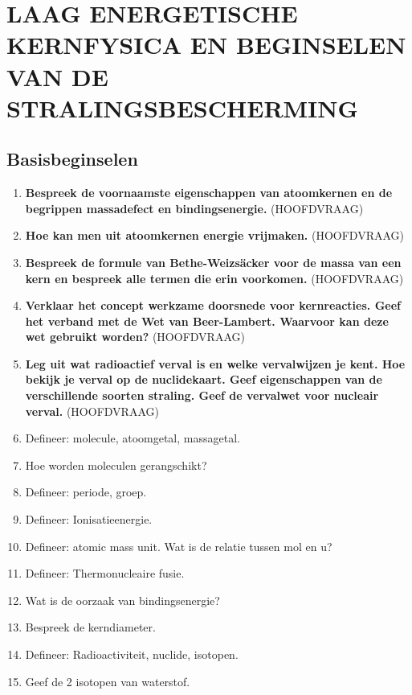 \documentclass[12pt]{article}
\begin{document}
    \maketitle

    \section{LAAG ENERGETISCHE KERNFYSICA EN BEGINSELEN VAN DE STRALINGSBESCHERMING}
    \subsection{Basisbeginselen}
    \begin{enumerate}
        \item \textbf{Bespreek de voornaamste eigenschappen van atoomkernen en de begrippen massadefect en bindingsenergie.} (HOOFDVRAAG)
        \item \textbf{Hoe kan men uit atoomkernen energie vrijmaken.} (HOOFDVRAAG)
        \item \textbf{Bespreek de formule van Bethe-Weizsäcker voor de massa van een kern en bespreek alle termen die erin voorkomen.} (HOOFDVRAAG)
        \item \textbf{Verklaar het concept werkzame doorsnede voor kernreacties. Geef het verband met de Wet van Beer-Lambert. Waarvoor kan deze wet gebruikt worden?} (HOOFDVRAAG)
        \item \textbf{Leg uit wat radioactief verval is en welke vervalwijzen je kent. Hoe bekijk je verval op de nuclidekaart. Geef eigenschappen van de verschillende soorten straling. Geef de vervalwet voor nucleair verval.} (HOOFDVRAAG)
        \item Defineer: molecule, atoomgetal, massagetal.
        \item Hoe worden moleculen gerangschikt?
        \item Defineer: periode, groep.
        \item Defineer: Ionisatieenergie.
        \item Defineer: atomic mass unit. Wat is de relatie tussen mol en u?
        \item Defineer: Thermonucleaire fusie.
        \item Wat is de oorzaak van bindingsenergie?
        \item Bespreek de kerndiameter.
        \item Defineer: Radioactiviteit, nuclide, isotopen.
        \item Geef de 2 isotopen van waterstof.

\end{enumerate}
\end{document}
